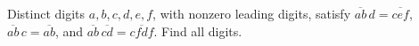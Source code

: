 Distinct digits $a,b,c,d,e,f$, with nonzero leading digits, satisfy $\overline{ab}\,d=\overline{cef}$, $\overline{ab}\,c=\overline{ab}$, and $\overline{ab}\,\overline{cd}=\overline{cfdf}$. Find all digits.
